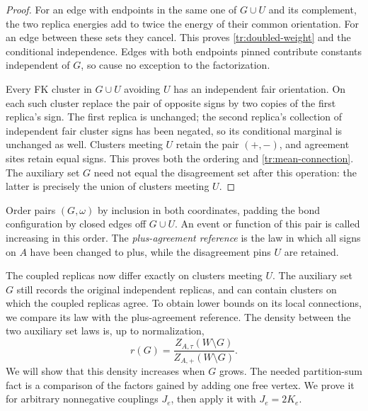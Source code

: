 \documentclass[11pt]{article}
\theoremstyle{definition}
\theoremstyle{remark}
\numberwithin{equation}{section}
\begin{document}
\begin{proof}
For an edge with endpoints in the same one of $G\cup U$ and its complement,
the two replica energies add to twice the energy of their common
orientation. For an edge between these sets they cancel. This proves
\eqref{tr:doubled-weight} and the conditional independence. Edges with
both endpoints pinned contribute constants independent of $G$, so cause
no exception to the factorization.

Every FK cluster in $G\cup U$ avoiding $U$ has an independent fair
orientation. On each such cluster replace the pair of opposite signs by
two copies of the first replica's sign. The first replica is unchanged;
the second replica's collection of independent fair cluster signs has been
negated, so its conditional marginal is unchanged as well. Clusters
meeting $U$ retain the pair $(+,-)$, and agreement sites retain equal
signs. This proves both the ordering and \eqref{tr:mean-connection}.
The auxiliary set $G$ need not equal the disagreement set after this
operation: the latter is precisely the union of clusters meeting $U$.
\end{proof}

Order pairs $(G,\omega)$ by inclusion in both coordinates, padding the
bond configuration by closed edges off $G\cup U$. An event or function of
this pair is called increasing in this order. The \emph{plus-agreement
reference} is the law in which all signs on $A$ have been changed to plus,
while the disagreement pins $U$ are retained.

The coupled replicas now differ exactly on clusters meeting $U$.
The auxiliary set $G$ still records the original independent replicas,
and can contain clusters on which the coupled replicas agree. To obtain
lower bounds on its local connections, we compare its law with the
plus-agreement reference. The density between the two auxiliary set laws
is, up to normalization,
\[
 r(G)=\frac{Z_{A,\tau}(W\setminus G)}{Z_{A,+}(W\setminus G)}.
\]
We will show that this density increases when $G$ grows. The needed
partition-sum fact is a comparison of the factors gained by adding one
free vertex. We prove it for arbitrary nonnegative couplings $J_e$,
then apply it with $J_e=2K_e$.
\end{document}

